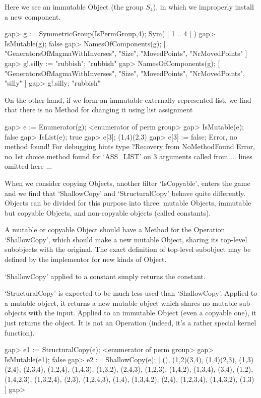Here we see an immutable Object (the group $S_4$), in which we improperly
install a new component.

\beginexample
gap> g := SymmetricGroup(IsPermGroup,4);
Sym( [ 1 .. 4 ] )
gap> IsMutable(g);
false
gap> NamesOfComponents(g);
[ "GeneratorsOfMagmaWithInverses", "Size", "MovedPoints", "NrMovedPoints" ]
gap> g!.silly := "rubbish";
"rubbish"
gap> NamesOfComponents(g);
[ "GeneratorsOfMagmaWithInverses", "Size", "MovedPoints", "NrMovedPoints", 
  "silly" ]
gap> g!.silly;
"rubbish"
\endexample

On the other hand, if we form an immutable externally represented list, we
find that there is no Method for changing it using list assignment

\beginexample
gap> e := Enumerator(g);
<enumerator of perm group>
gap> IsMutable(e);
false
gap> IsList(e);
true
gap> e[3];
(1,4)(2,3)
gap> e[3] := false;
Error, no method found! For debugging hints type ?Recovery from NoMethodFound
Error, no 1st choice method found for `ASS_LIST' on 3 arguments called from
... lines omitted here ...
\endexample

When we consider copying Objects, another filter `IsCopyable', enters
the game and we find that `ShallowCopy' and `StructuralCopy' behave quite
differently. Objects can be divided for this purpose into three:
mutable Objects, immutable but copyable Objects, and non-copyable
objects (called constants).

A mutable or copyable  Object should have a Method for the Operation
`ShallowCopy', which should make a new mutable Object, sharing its top-level
subobjects with the original. The exact definition of top-level subobject may
be defined by the implementor for new kinds of Object.

`ShallowCopy' applied to a constant simply returns the constant.

`StructuralCopy' is expected to be much less used than
`ShallowCopy'. Applied to a mutable object, it returns a new mutable
object which shares no mutable sub-objects with the input. Applied to
an immutable Object (even a copyable one), it just returns the
object. It is not an Operation (indeed, it's a rather special kernel
function).

\beginexample
gap> e1 := StructuralCopy(e);
<enumerator of perm group>
gap> IsMutable(e1);
false
gap> e2 := ShallowCopy(e);
[ (), (1,2)(3,4), (1,4)(2,3), (1,3)(2,4), (2,3,4), (1,2,4), (1,4,3), (1,3,2), 
  (2,4,3), (1,2,3), (1,4,2), (1,3,4), (3,4), (1,2), (1,4,2,3), (1,3,2,4), 
  (2,3), (1,2,4,3), (1,4), (1,3,4,2), (2,4), (1,2,3,4), (1,4,3,2), (1,3) ]
gap> 
\endexample

